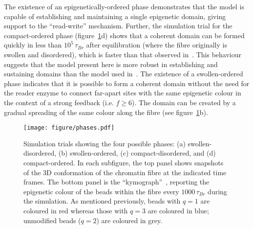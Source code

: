 \documentclass[12pt]{article}
\newcommand*{\DataFig}{/Users/MichaelChiang/Desktop/epigenetics_data/}
\begin{document}
The existence of an epigenetically-ordered phase demonstrates that the model is capable of establishing and maintaining a single epigenetic domain, giving support to the ``read-write'' mechanism. Further, the simulation trial for the compact-ordered phase (figure~\ref{fig:phases}d) shows that a coherent domain can be formed quickly in less than $10^5\,\tau_{Br}$ after equilibration (where the fibre originally is swollen and disordered), which is faster than that observed in~\cite{michieletto2016}. This behaviour suggests that the model present here is more robust in establishing and sustaining domains than the model used in~\cite{michieletto2016}. The existence of a swollen-ordered phase indicates that it is possible to form a coherent domain without the need for the reader enzyme to connect far-apart sites with the same epigenetic colour in the context of a strong feedback (i.e. $f \ge 6$). The domain can be created by a gradual spreading of the same colour along the fibre (see figure~\ref{fig:phases}b). 

\begin{figure}[t]
\centering
\texttt{[image: figure/phases.pdf]}
\caption{Simulation trials showing the four possible phases: (a) swollen-disordered, (b) swollen-ordered, (c) compact-disordered, and (d) compact-ordered. In each subfigure, the top panel shows snapshots of the 3D conformation of the chromatin fibre at the indicated time frames. The bottom panel is the ``kymograph''~\cite{brumley2014}, reporting the epigenetic colour of the beads within the fibre every $1000\,\tau_{Br}$ during the simulation. As mentioned previously, beads with $q = 1$ are coloured in red whereas those with $q = 3$ are coloured in blue; unmodified beads ($q = 2$) are coloured in grey.}
\label{fig:phases}
\end{figure}
\end{document}
